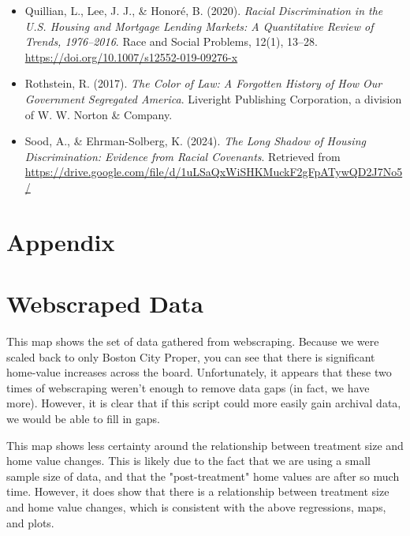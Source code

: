 \documentclass{article}
\begin{document}
\begin{itemize}[label={}]
    \item Quillian, L., Lee, J. J., \& Honoré, B. (2020). \textit{Racial Discrimination in the U.S. Housing and Mortgage Lending Markets: A Quantitative Review of Trends, 1976–2016}. Race and Social Problems, 12(1), 13–28. \url{https://doi.org/10.1007/s12552-019-09276-x}
    
    \item Rothstein, R. (2017). \textit{The Color of Law: A Forgotten History of How Our Government Segregated America}. Liveright Publishing Corporation, a division of W. W. Norton \& Company.
    
    \item Sood, A., \& Ehrman-Solberg, K. (2024). \textit{The Long Shadow of Housing Discrimination: Evidence from Racial Covenants}. Retrieved from \url{https://drive.google.com/file/d/1uLSaQxWiSHKMuckF2gFpATywQD2J7No5/}
\end{itemize}
\appendix
\section*{Appendix}
\section{Webscraped Data}{\label{webscraped}}
\begin{center}
    \end{center}
    This map shows the set of data gathered from webscraping. Because we were scaled back to only Boston City Proper, you can see that there is significant home-value increases across the board. Unfortunately, it appears that these two times of webscraping weren't enough to remove data gaps (in fact, we have more). However, it is clear that if this script could more easily gain archival data, we would be able to fill in gaps.
    \begin{center}
        \end{center}
This map shows less certainty around the relationship between treatment size and home value changes. This is likely due to the fact that we are using a small sample size of data, and that the "post-treatment" home values are after so much time. However, it does show that there is a relationship between treatment size and home value changes, which is consistent with the above regressions, maps, and plots.
\end{document}
